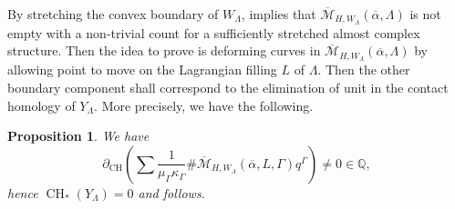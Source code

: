 \documentclass[reqno,11pt]{amsart}
\numberwithin{equation}{section}
\newtheorem{proposition}[theorem]{\textbf{Proposition}}
\def\Q{{\mathbb Q}}
\def\cM{{\mathcal M}}
\DeclareMathOperator{\CHA}{CH}
\DeclareMathOperator{\CH}{CH}
\begin{document}
By stretching the convex boundary of $W_{\Lambda}$,  implies that $\overline{\cM}_{H,W_{\Lambda}}(\overline{\alpha},\Lambda)$ is not empty with a non-trivial count for a sufficiently stretched almost complex structure. Then the idea to prove  is deforming curves in $\overline{\cM}_{H,W_{\Lambda}}(\overline{\alpha},\Lambda)$ by allowing point to move on the Lagrangian filling $L$ of $\Lambda$. Then the other boundary component shall correspond to the elimination of unit in the contact homology of $Y_{\Lambda}$. More precisely, we have the following. 

\begin{proposition}\label{prop:corbordism}
    We have
    $$\partial_{\CH}\left(\sum\frac{1}{\mu_{\Gamma}\kappa_{\Gamma}}\#\overline{\cM}_{H,W_{\Lambda}}(\overline{\alpha},L,\Gamma)q^{\Gamma}\right)\ne 0 \in \Q,$$hence $\CHA_*(Y_{\Lambda})=0$ and  follows.
\end{proposition}
\end{document}

